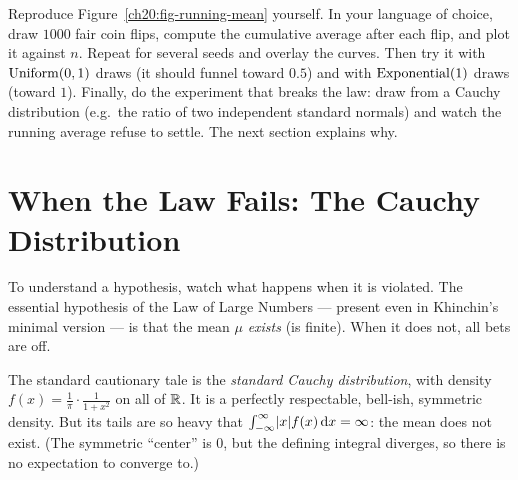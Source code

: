 \begin{labbox}
Reproduce Figure~\ref{ch20:fig-running-mean} yourself. In your language of choice, draw $1000$ fair coin flips, compute the cumulative average after each flip, and plot it against $n$. Repeat for several seeds and overlay the curves. Then try it with $\operatorname{Uniform}(0,1)$ draws (it should funnel toward $0.5$) and with $\operatorname{Exponential}(1)$ draws (toward $1$). Finally, do the experiment that breaks the law: draw from a Cauchy distribution (e.g.\ the ratio of two independent standard normals) and watch the running average refuse to settle. The next section explains why.
\end{labbox}

\section{When the Law Fails: The Cauchy Distribution}
\label{ch20:cauchy}

To understand a hypothesis, watch what happens when it is violated. The essential hypothesis of the Law of Large Numbers --- present even in Khinchin's minimal version --- is that the mean $\mu$ \emph{exists} (is finite). When it does not, all bets are off.

The standard cautionary tale is the \emph{standard Cauchy distribution}, with density $f(x) = \tfrac1\pi \cdot \tfrac{1}{1+x^2}$ on all of $\mathbb{R}$. It is a perfectly respectable, bell-ish, symmetric density. But its tails are so heavy that $\int_{-\infty}^{\infty} \lvert x\rvert f(x)\,\mathrm{d} x = \infty$: the mean does not exist. (The symmetric ``center'' is $0$, but the defining integral diverges, so there is no expectation to converge to.)

